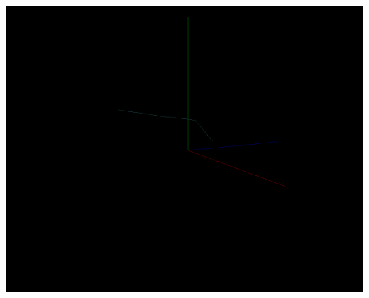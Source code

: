 \documentclass[a4paper, 11pt]{article}
\begin{document}
            \begin{center}
                \includegraphics[width = \textwidth]{Animation1-5.PNG}
            \end{center}
\end{document}
